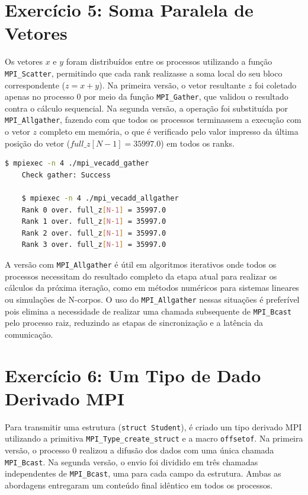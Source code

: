 \documentclass[a4paper, 12pt]{article}
\begin{document}
\section{Exercício 5: Soma Paralela de Vetores}
Os vetores $x$ e $y$ foram distribuídos entre os processos utilizando a função \verb|MPI_Scatter|, permitindo que cada rank realizasse a soma local do seu bloco correspondente ($z = x + y$). Na primeira versão, o vetor resultante $z$ foi coletado apenas no processo 0 por meio da função \verb|MPI_Gather|, que validou o resultado contra o cálculo sequencial. Na segunda versão, a operação foi substituída por \verb|MPI_Allgather|, fazendo com que todos os processos terminassem a execução com o vetor $z$ completo em memória, o que é verificado pelo valor impresso da última posição do vetor ($full\_z[N-1] = 35997.0$) em todos os ranks.

\begin{lstlisting}[language=bash, caption={Saída da soma paralela de vetores}, basicstyle=\ttfamily\footnotesize]
    $ mpiexec -n 4 ./mpi_vecadd_gather
    Check gather: Success

    $ mpiexec -n 4 ./mpi_vecadd_allgather
    Rank 0 over. full_z[N-1] = 35997.0
    Rank 1 over. full_z[N-1] = 35997.0
    Rank 2 over. full_z[N-1] = 35997.0
    Rank 3 over. full_z[N-1] = 35997.0
\end{lstlisting}

A versão com \verb|MPI_Allgather| é útil em algoritmos iterativos onde todos os processos necessitam do resultado completo da etapa atual para realizar os cálculos da próxima iteração, como em métodos numéricos para sistemas lineares ou simulações de N-corpos. O uso do \verb|MPI_Allgather| nessas situações é preferível pois elimina a necessidade de realizar uma chamada subsequente de \verb|MPI_Bcast| pelo processo raiz, reduzindo as etapas de sincronização e a latência da comunicação.

\section{Exercício 6: Um Tipo de Dado Derivado MPI}
Para transmitir uma estrutura (\verb|struct Student|), é criado um tipo derivado MPI utilizando a primitiva \verb|MPI_Type_create_struct| e a macro \verb|offsetof|. Na primeira versão, o processo 0 realizou a difusão dos dados com uma única chamada \verb|MPI_Bcast|. Na segunda versão, o envio foi dividido em três chamadas independentes de \verb|MPI_Bcast|, uma para cada campo da estrutura. Ambas as abordagens entregaram um conteúdo final idêntico em todos os processos.
\end{document}
